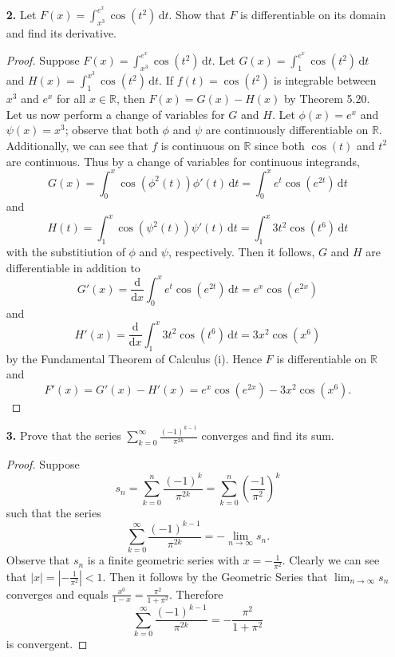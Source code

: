 \documentclass[ 12pt ]{article}
\begin{document}
\begin{enumerate}
	\item[\textbf{2.}] Let $F(x) = \int_{x^3}^{e^x} \cos(t^2)\,\mathrm{d}t$. Show that $F$ is differentiable on its domain and find its derivative.

	\begin{proof}
		Suppose $F(x) = \int_{x^3}^{e^x} \cos(t^2)\,\mathrm{d}t$. Let $G(x) = \int_{1}^{e^x} \cos(t^2)\,\mathrm{d}t$ and $H(x) = \int_{1}^{x^3} \cos(t^2)\,\mathrm{d}t$. If $f(t) = \cos(t^2)$ is
		integrable between $x^3$ and $e^x$ for all $x \in \mathbb{R}$, then $F(x) = G(x) - H(x)$ by Theorem 5.20. Let us now perform a change of variables for $G$ and $H$.
		Let $\phi(x) = e^x$ and $\psi(x) = x^3$; observe that both $\phi$ and $\psi$ are continuously differentiable on $\mathbb{R}$. Additionally, we can see that $f$ is
		continuous on $\mathbb{R}$ since both $\cos(t)$ and $t^2$ are continuous. Thus by a change of variables for continuous integrands, $$G(x) =
		\int_{0}^{x} \cos(\phi^2(t))\phi'(t)\,\mathrm{d}t = \int_{0}^{x} e^t\cos(e^{2t})\,\mathrm{d}t$$ and $$H(t) = \int_{1}^{x} \cos(\psi^2(t))\psi'(t)\,\mathrm{d}t = \int_{1}^{x} 3t^2\cos(t^6)\,\mathrm{d}t$$
		with the substitiution of $\phi$ and $\psi$, respectively. Then it follows, $G$ and $H$ are differentiable in addition to $$G'(x) =
		\frac{\mathrm{d} }{\mathrm{d} x} \int_{0}^{x} e^t\cos(e^{2t})\,\mathrm{d}t = e^x\cos(e^{2x})$$ and $$H'(x) = \frac{\mathrm{d} }{\mathrm{d} x} \int_{1}^{x} 3t^2\cos(t^6)\,\mathrm{d}t =
		3x^2\cos(x^6)$$ by the Fundamental Theorem of Calculus (i). Hence $F$ is differentiable on $\mathbb{R}$ and $$F'(x) = G'(x) - H'(x) = e^x\cos(e^{2x}) - 3x^2\cos(x^6).$$
	\end{proof}


	\item[\textbf{3.}] Prove that the series $\sum_{k = 0}^\infty \frac{(-1)^{k-1}}{\pi^{2k}}$ converges and find its sum.

	\begin{proof}
		Suppose $$s_n = \sum_{k=0}^n \frac{(-1)^k}{\pi^{2k}} = \sum_{k=0}^n \left ( \frac{-1}{\pi^2} \right )^k$$ such that the series $$\sum_{k = 0}^\infty
		\frac{(-1)^{k-1}}{\pi^{2k}} = -\lim_{n \rightarrow \infty} s_n.$$ Observe that $s_n$ is a finite geometric series with $x = -\frac{1}{\pi^2}$. Clearly we can see
		that $|x| = \left | -\frac{1}{\pi^2} \right | < 1$. Then it follows by the Geometric Series that $\lim_{n \rightarrow \infty} s_n$ converges and equals
		$\frac{x^0}{1 - x} = \frac{\pi^2}{1 + \pi^2}$. Therefore $$\sum_{k = 0}^\infty \frac{(-1)^{k-1}}{\pi^{2k}} = -\frac{\pi^2}{1 + \pi^2}$$ is convergent.
	\end{proof}
	\newpage



\end{enumerate}
\end{document}
